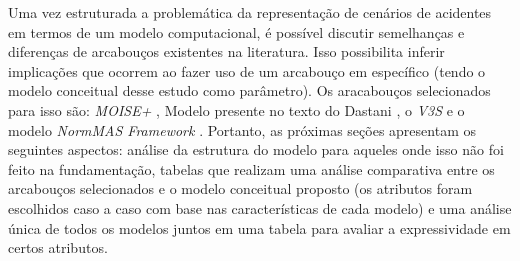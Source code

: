 Uma vez estruturada a problemática da representação de cenários de acidentes em termos de um modelo computacional, é possível discutir semelhanças e diferenças de arcabouços existentes na literatura. Isso possibilita inferir implicações que ocorrem ao fazer uso de um arcabouço em específico (tendo o modelo conceitual desse estudo como parâmetro). Os aracabouços selecionados para isso são: \textit{MOISE+} \cite{moiseframework}, Modelo presente no texto do Dastani \cite{dastaniframework}, o \textit{V3S} \cite{v3sframework} e o modelo \textit{NormMAS Framework} \cite{normas}. Portanto, as próximas seções apresentam os seguintes aspectos: análise da estrutura do modelo para aqueles onde isso não foi feito na fundamentação, tabelas que realizam uma análise comparativa entre os arcabouços selecionados e o modelo conceitual proposto (os atributos foram escolhidos caso a caso com base nas características de cada modelo) e uma análise única de todos os modelos juntos em uma tabela para avaliar a expressividade em certos atributos.